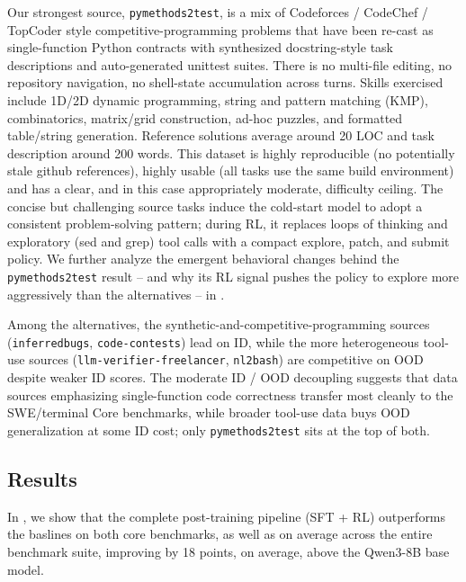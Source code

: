 \documentclass{article}
\begin{document}
Our strongest source, \texttt{pymethods2test}, is a mix of Codeforces / CodeChef / TopCoder style competitive-programming problems that have been re-cast as single-function Python contracts with synthesized docstring-style task descriptions and auto-generated unittest suites. There is no multi-file editing, no repository navigation, no shell-state accumulation across turns. Skills exercised include 1D/2D dynamic
programming, string and pattern matching (KMP), combinatorics, matrix/grid construction, ad-hoc puzzles, and formatted table/string generation. Reference solutions average around 20 LOC and task description around 200 words. This dataset is highly reproducible (no potentially stale github references), highly usable (all tasks use the same build environment) and has a clear, and in this case appropriately moderate, difficulty ceiling. The concise but challenging source tasks induce the cold-start model to adopt a consistent problem-solving pattern; during RL, it replaces loops of thinking and exploratory (sed and grep) tool calls with a compact explore, patch, and submit policy. We further analyze the emergent behavioral changes behind the \texttt{pymethods2test} result -- and why its RL signal pushes the policy to explore more aggressively than the alternatives -- in . 

Among the alternatives, the synthetic-and-competitive-programming sources (\texttt{inferredbugs}, \texttt{code-contests}) lead on ID, while the more heterogeneous tool-use sources (\texttt{llm-verifier-freelancer}, \texttt{nl2bash}) are competitive on OOD despite weaker ID scores. The moderate ID / OOD decoupling suggests that data sources emphasizing single-function code correctness transfer most cleanly to the SWE/terminal Core benchmarks, while broader tool-use data buys OOD generalization at some ID cost; only \texttt{pymethods2test} sits at the top of both.

\subsection{Results}
\label{sec:rl-results}



In , we show that the complete post-training pipeline (SFT + RL) outperforms the baslines on both core benchmarks, as well as on average across the entire benchmark suite, improving by 18 points, on average, above the Qwen3-8B base model. 


\end{document}
